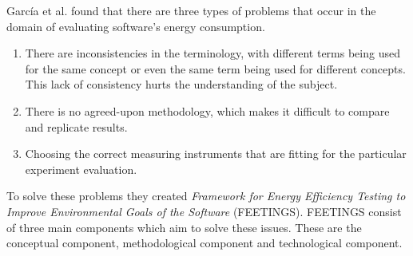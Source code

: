 



García et al. found that there are three types of problems that occur in the domain of evaluating software's energy consumption.\cite{GarciaFEETINGS} 
\begin{enumerate}
    \item There are inconsistencies in the terminology, with different terms being used for the same concept or even the same term being used for different concepts. This lack of consistency hurts the understanding of the subject.
    \item There is no agreed-upon methodology, which makes it difficult to compare and replicate results.
    \item Choosing the correct measuring instruments that are fitting for the particular experiment evaluation.
\end{enumerate}

To solve these problems they created \textit{Framework for Energy Efficiency Testing to Improve Environmental Goals of the Software} (FEETINGS). FEETINGS consist of three main components which aim to solve these issues. These are the conceptual component, methodological component and technological component.\cite{GarciaFEETINGS}\nytafsnit

%

